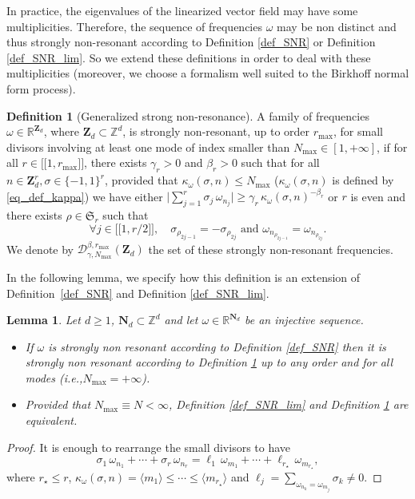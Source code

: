 \documentclass[11pt]{article}
\newcommand{\ie}{i.e.,\xspace}
\newcommand{\llbracket}{\mathopen{[\!\![}}
\newcommand{\rrbracket}{\mathclose{]\!\!]}}
\newtheorem{lemma}[theorem]{Lemma}
\theoremstyle{definition}
\newtheorem{definition}[theorem]{Definition}
\begin{document}
In practice, the eigenvalues of the linearized vector field may have some multiplicities. Therefore, the sequence of frequencies $\omega$ may be non distinct and thus strongly non-resonant according to Definition \ref{def_SNR} or Definition \ref{def_SNR_lim}. So we extend these definitions in order to deal with these multiplicities (moreover, we choose a formalism well suited to the Birkhoff normal form process).
\begin{definition}[Generalized strong non-resonance] \label{def_nonres} A family of frequencies $\omega\in \mathbb{R}^{\mathbf{Z}_d}$, where $\mathbf{Z}_d \subset \mathbb{Z}^d$, is strongly non-resonant, up to order $r_{\max}$, for small divisors involving at least one mode of index smaller than $N_{\max}\in [1,+\infty]$, if for all $r \in \llbracket 1,r_{\max} \rrbracket $, there exists $\gamma_r>0$ and $\beta_r>0$ such that for all $n \in \mathbf{Z}_d^{r}, \sigma \in \{ -1,1\}^{r}$, provided that $\kappa_\omega(\sigma,n)\leq N_{\max}$ ($\kappa_\omega(\sigma,n)$ is defined by \eqref{eq_def_kappa})
we have either
$
\big|\sum_{j=1}^{r} \sigma_j \, \omega_{n_j}\big| \geq \gamma_r \, \kappa_\omega(\sigma,n)^{-\beta_r}
$
or $r$ is even and there exists $\rho \in \mathfrak{S}_{r}$ such that
\[
\forall j \in \llbracket 1,r/2\rrbracket, \quad \sigma_{\rho_{2j-1}}= -\sigma_{\rho_{2j}} \text{ and } \omega_{n_{\rho_{2j-1}}}=\omega_{n_{\rho_{2j}}}.
\]
We denote by $\mathcal{D}_{\gamma,N_{\max}}^{\beta,r_{\max}}(\mathbf{Z}_d)$ the set of these strongly non-resonant frequencies.
\end{definition}
In the following lemma, we specify how this definition is an extension of Definition~\ref{def_SNR} and Definition \ref{def_SNR_lim}.

\begin{lemma} \label{lem_defs_equiv} Let $d\geq 1$, $\mathbf{N}_d \subset \mathbb{Z}^d$ and let $\omega \in \mathbb{R}^{\mathbf{N}_d}$ be an injective sequence.
\begin{itemize}
\item
If $\omega$ is strongly non resonant according to Definition \ref{def_SNR} then it is strongly non resonant according to Definition \ref{def_nonres} up to any order and for all modes (\ie $N_{\max} = +\infty$).

\item
Provided that $N_{\max}\equiv N<\infty$, Definition \ref{def_SNR_lim} and Definition \ref{def_nonres} are equivalent.
\end{itemize}
\end{lemma}
\begin{proof} It is enough to rearrange the small divisors to have
\[
\sigma_1 \, \omega_{n_1} + \cdots + \sigma_r \, \omega_{n_r} = \ell_1 \, \omega_{m_1} + \cdots + \ell_{r_\star} \, \omega_{m_{r_\star}},
\]
where $r_\star\leq r$, $\kappa_\omega(\sigma,n) = \langle m_1 \rangle \leq \cdots \leq \langle m_{r_{\star}} \rangle$ and $\ell_j =\sum_{\omega_{n_k} = \omega_{m_j}} \sigma_k \neq 0$.
\end{proof}
\end{document}
